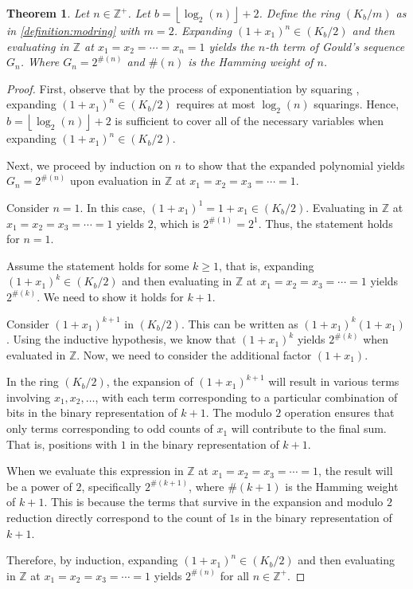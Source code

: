 \documentclass{article}
\theoremstyle{plain}
\theoremstyle{definition}
\newtheorem{theorem}{Theorem}
\newcommand{\floor}[1]{\left\lfloor #1 \right\rfloor}
\newcommand{\Z}{\mathbb{Z}}
\newcommand{\K}{K}
\newcommand{\wt}[1]{\#(#1)}
\begin{document}
\begin{theorem}
\label{theorem:goulds}
\textit{
Let $n \in \Z^+$. Let $b={\floor{\log_2(n)}+2}$. Define the ring $(\K_b/m)$ as in \cref{definition:modring} with $m=2$. Expanding $(1+x_1)^n \in (\K_b/2)$ and then evaluating in $\Z$ at $x_1=x_2=\cdots=x_n=1$ yields the $n$-th term of Gould's sequence $G_n$. Where $G_n = 2^{\wt{n}}$ and $\wt{n}$ is the Hamming weight of $n$.
}
\end{theorem}
\begin{proof}
First, observe that by the process of exponentiation by squaring \cite{knuth1997art}, expanding $(1+x_1)^n \in (\K_b/2)$ requires at most $\log_2(n)$ squarings. Hence, $b={\floor{\log_2(n)}+2}$ is sufficient to cover all of the necessary variables when expanding $(1+x_1)^n \in (\K_b/2)$.

Next, we proceed by induction on $n$ to show that the expanded polynomial yields $G_n = 2^{\wt{n}}$ upon evaluation in $\Z$ at $x_1 = x_2 = x_3 = \cdots = 1$.

Consider $n = 1$. In this case, $(1 + x_1)^1 = 1 + x_1 \in (\K_b/2)$. Evaluating in $\Z$ at $x_1 = x_2 = x_3 = \cdots = 1$ yields $2$, which is $2^{\wt{1}} = 2^1$. Thus, the statement holds for $n = 1$.

Assume the statement holds for some $k \geq 1$, that is, expanding $(1 + x_1)^k \in (\K_b/2)$ and then evaluating in $\Z$ at $x_1 = x_2 = x_3 = \cdots = 1$ yields $2^{\wt{k}}$. We need to show it holds for $k+1$.

Consider $(1 + x_1)^{k+1}$ in $(\K_b/2)$. This can be written as $(1 + x_1)^k (1 + x_1)$. Using the inductive hypothesis, we know that $(1 + x_1)^k$ yields $2^{\wt{k}}$ when evaluated in $\Z$. Now, we need to consider the additional factor $(1 + x_1)$.

In the ring $(\K_b/2)$, the expansion of $(1 + x_1)^{k+1}$ will result in various terms involving $x_1, x_2, \ldots$, with each term corresponding to a particular combination of bits in the binary representation of $k+1$. The modulo $2$ operation ensures that only terms corresponding to odd counts of $x_1$ will contribute to the final sum. That is, positions with $1$ in the binary representation of $k+1$.

When we evaluate this expression in $\Z$ at $x_1 = x_2 = x_3 = \cdots = 1$, the result will be a power of $2$, specifically $2^{\wt{k+1}}$, where $\wt{k+1}$ is the Hamming weight of $k+1$. This is because the terms that survive in the expansion and modulo $2$ reduction directly correspond to the count of $1$s in the binary representation of $k+1$.

Therefore, by induction, expanding $(1 + x_1)^n \in (\K_b/2)$ and then evaluating in $\Z$ at $ x_1 = x_2 = x_3 = \cdots = 1$ yields $2^{\wt{n}}$ for all $n \in \Z^+$.
\end{proof}
\end{document}
